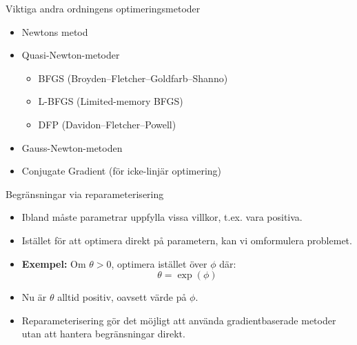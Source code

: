 \documentclass[10pt,english]{beamer}
\begin{document}
\begin{frame}{Viktiga andra ordningens optimeringsmetoder}
  \begin{itemize}
    \item Newtons metod
    \item Quasi-Newton-metoder
    \begin{itemize}
      \item BFGS (Broyden–Fletcher–Goldfarb–Shanno)
      \item L-BFGS (Limited-memory BFGS)
      \item DFP (Davidon–Fletcher–Powell)
    \end{itemize}
    \item Gauss-Newton-metoden
    \item Conjugate Gradient (för icke-linjär optimering)
  \end{itemize}
\end{frame}

\begin{frame}{Begränsningar via reparameterisering}
  \begin{itemize}
    \item Ibland måste parametrar uppfylla vissa villkor, t.ex. vara positiva.
    \item Istället för att optimera direkt på parametern, kan vi omformulera problemet.
    \item \textbf{Exempel:} Om \( \theta > 0 \), optimera istället över \( \phi \) där:
    \[
    \theta = \exp(\phi)
    \]
    \item Nu är \( \theta \) alltid positiv, oavsett värde på \( \phi \).
    \item Reparameterisering gör det möjligt att använda gradientbaserade metoder utan att hantera begränsningar direkt.
  \end{itemize}
\end{frame}
\end{document}
